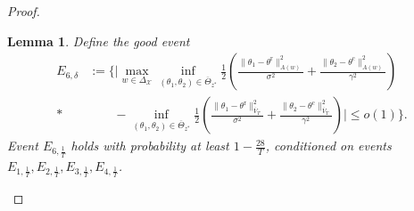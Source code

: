 \documentclass[accepted]{uai2025} %
\theoremstyle{plain}
\newtheorem{lemma}[theorem]{Lemma}
\theoremstyle{definition}
\theoremstyle{remark}
\newcommand{\truethetac}{\theta^{\mathrm{c}}}
\newcommand{\truethetar}{\theta^{\mathrm{r}}}
\begin{document}
\begin{proof}
\begin{lemma}
Define the good event 
\begin{align*}
E_{6,\delta}&:=\bigg\{
    \bigg| \max_{w \in \Delta_{\mathcal{X}}} \inf_{(\theta_1, \theta_2) \in \overline{\Theta}_{z^*}} \frac{1}{2} \left( \frac{\lVert \theta_1 - \truethetar \rVert^2_{A(w)}}{\sigma^2} + \frac{\lVert \theta_2 - \truethetac \rVert^2_{A(w)}}{\gamma^2} \right)\\*
    &\qquad- \inf_{(\theta_1, \theta_2) \in \overline{\Theta}_{z^*}} \frac{1}{2} \left( \frac{\lVert \theta_1 - \truethetar \rVert^2_{\overline{V}_T}}{\sigma^2} + \frac{\lVert \theta_2 - \truethetac \rVert^2_{\overline{V}_T}}{\gamma^2} \right)
    \bigg| \le o(1)
\bigg\}    .
\end{align*}
Event \( E_{6,\frac{1}{T}} \) holds with probability at least \( 1 - \frac{28}{T}\), conditioned on events \( E_{1,\frac{1}{T}}, E_{2,\frac{1}{T}}, E_{3,\frac{1}{T}}, E_{4,\frac{1}{T}} \).
\end{lemma}


\end{proof}
\end{document}
